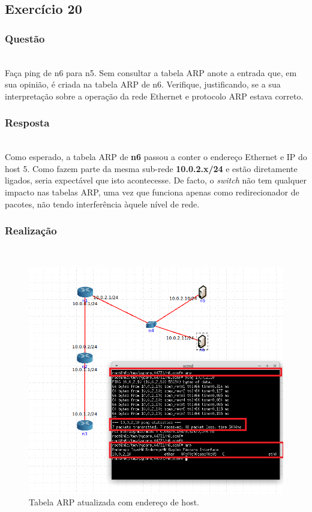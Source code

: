 \documentclass{llncs}
\begin{document}
\subsection{Exercício 20}
\subsubsection{Questão}\rule[-10pt]{0pt}{10pt}\\

Faça ping de n6 para n5. Sem consultar a tabela ARP anote a entrada que, em sua opinião, é criada na tabela ARP de n6. Verifique, justificando, se a sua interpretação sobre a operação da rede Ethernet e protocolo ARP estava correto.

\subsubsection{Resposta}\rule[-10pt]{0pt}{10pt}\\

Como esperado, a tabela ARP de \textbf{n6} passou a conter o endereço Ethernet e IP do host 5. Como fazem parte da mesma sub-rede \textbf{10.0.2.x/24} e estão diretamente ligados, seria expectável que isto acontecesse. De facto, o \textit{switch} não tem qualquer impacto nas tabelas ARP, uma vez que funciona apenas como redirecionador de pacotes, não tendo interferência àquele nível de rede.

\subsubsection{Realização}\rule[-10pt]{0pt}{10pt}\\

\begin{figure}
  \begin{center}
    \includegraphics[scale=0.6]{./imagens/5_20.png} 
  \end{center}
  \caption{Tabela ARP atualizada com endereço de host.}
  \label{fig:5_20}
\end{figure} 
\end{document}
